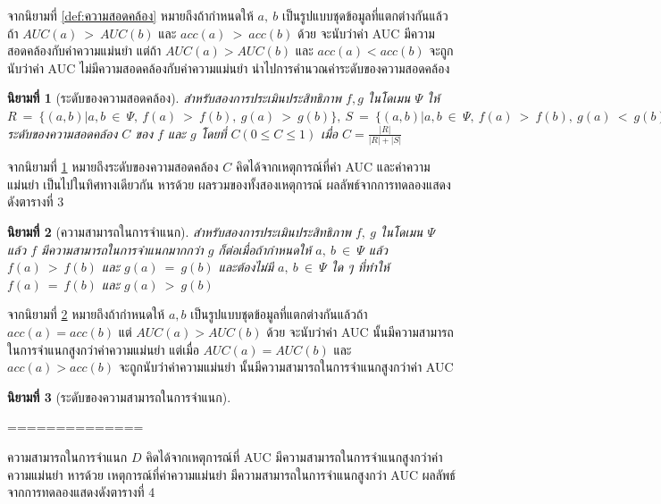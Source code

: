 \documentclass[twoside, twocolumn, 12pt]{article}
\newtheorem{mydef}{นิยามที่}
\begin{document}
จากนิยามที่ \ref{def:ความสอดคล้อง} หมายถึงถ้ากำหนดให้ $a,\:b$ เป็นรูปแบบชุดข้อมูลที่แตกต่างกันแล้วถ้า $AUC(a)\:>\:AUC(b)$ และ $acc(a)\:>\:acc(b)$ ด้วย จะนับว่าค่า AUC มีความสอดคล้องกับค่าความแม่นยำ แต่ถ้า $AUC(a) > AUC(b)$ และ $acc(a) < acc(b)$ จะถูกนับว่าค่า AUC ไม่มีความสอดคล้องกับค่าความแม่นยำ นำไปการคำนวณค่าระดับของความสอดคล้อง

\begin{mydef}[ระดับของความสอดคล้อง]\label{def:ระดับของความสอดคล้อง}
สำหรับสองการประเมินประสิทธิภาพ $f, g$ ในโดเมน $\Psi$ ให้ $R\:=\:\{(a,b)|a,b\:\in\:\Psi,\:f(a)\:>\:f(b),\:g(a)\:>\:g(b)\},\:S\:=\:\{(a,b)|a,b\:\in\:\Psi,\:f(a)\:>\:f(b),\: g(a)\:<\:g(b)\}$ ระดับของความสอดคล้อง $C$ ของ $f$ และ $g$ โดยที่ $C(0 \leq C \leq 1)$ เมื่อ $C = \frac{|R|}{|R|+|S|}$
\end{mydef}

จากนิยามที่ \ref{def:ระดับของความสอดคล้อง} หมายถึงระดับของความสอดคล้อง $C$ คิดได้จากเหตุการณ์ที่ค่า AUC และค่าความแม่นยำ เป็นไปในทิศทางเดียวกัน หารด้วย ผลรวมของทั้งสองเหตุการณ์ ผลลัพธ์จากการทดลองแสดงดังตารางที่ 3

\begin{mydef}[ความสามารถในการจำแนก]\label{def:ความสามารถในการจำแนก}
สำหรับสองการประเมินประสิทธิภาพ $f,\:g$ ในโดเมน $\Psi$ แล้ว $f$ มีความสามารถในการจำแนกมากกว่า $g$ ก็ต่อเมื่อถ้ากำหนดให้ $a,\:b\:\in\:\Psi$ แล้ว $f(a)\:>\:f(b)$ และ $g(a)\:=\:g(b)$ และต้องไม่มี $a,\:b\:\in\:\Psi$ ใด ๆ ที่ทำให้ $f(a)\:=\:f(b)$ และ $g(a)\:>\:g(b)$
\end{mydef}

จากนิยามที่ \ref{def:ความสามารถในการจำแนก} หมายถึงถ้ากำหนดให้ $a, b$ เป็นรูปแบบชุดข้อมูลที่แตกต่างกันแล้วถ้า $acc(a)  = acc(b)$ แต่ $AUC(a) > AUC(b)$ ด้วย จะนับว่าค่า AUC นั้นมีความสามารถในการจำแนกสูงกว่าค่าความแม่นยำ แต่เมื่อ  $AUC(a) = AUC(b)$ และ $acc(a) > acc(b)$ จะถูกนับว่าค่าความแม่นยำ นั้นมีความสามารถในการจำแนกสูงกว่าค่า AUC 

\begin{mydef}[ระดับของความสามารถในการจำแนก]
\end{mydef}


==============


ความสามารถในการจำแนก $D$ คิดได้จากเหตุการณ์ที่ AUC มีความสามารถในการจำแนกสูงกว่าค่าความแม่นยำ หารด้วย เหตุการณ์ที่ค่าความแม่นยำ มีความสามารถในการจำแนกสูงกว่า AUC ผลลัพธ์จากการทดลองแสดงดังตารางที่ 4
\end{document}

